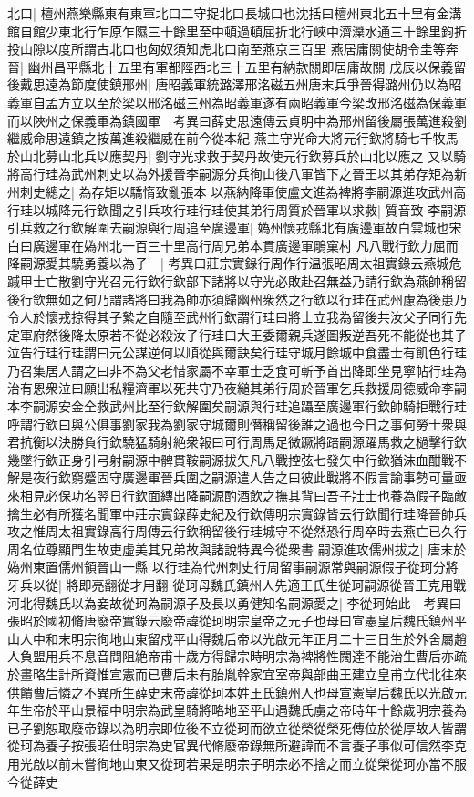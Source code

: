 北口|{
	檀州燕樂縣東有東軍北口二守捉北口長城口也沈括曰檀州東北五十里有金溝館自館少東北行乍原乍隰三十餘里至中頓過頓屈折北行峽中濟灤水通三十餘里鉤折投山隙以度所謂古北口也匈奴須知虎北口南至燕京三百里}
燕居庸關使胡令圭等奔晉|{
	幽州昌平縣北十五里有軍都陘西北三十五里有納款關即居庸故關}
戊辰以保義留後戴思遠為節度使鎮邢州|{
	唐昭義軍統潞澤邢洺磁五州唐末兵爭晉得潞州仍以為昭義軍自孟方立以至於梁以邢洺磁三州為昭義軍遂有兩昭義軍今梁改邢洺磁為保義軍而以陜州之保義軍為鎮國軍　考異曰薛史思遠傳云貞明中為邢州留後屬張萬進殺劉繼威命思遠鎮之按萬進殺繼威在前今從本紀}
燕主守光命大將元行欽將騎七千牧馬於山北募山北兵以應契丹|{
	劉守光求救于契丹故使元行欽募兵於山北以應之}
又以騎將高行珪為武州刺史以為外援晉李嗣源分兵徇山後八軍皆下之晉王以其弟存矩為新州刺史總之|{
	為存矩以驕惰致亂張本}
以燕納降軍使盧文進為裨將李嗣源進攻武州高行珪以城降元行欽聞之引兵攻行珪行珪使其弟行周質於晉軍以求救|{
	質音致}
李嗣源引兵救之行欽解圍去嗣源與行周追至廣邊軍|{
	媯州懷戎縣北有廣邊軍故白雲城也宋白曰廣邊軍在媯州北一百三十里高行周兄弟本貫廣邊軍鵰窠村}
凡八戰行欽力屈而降嗣源愛其驍勇養以為子　|{
	考異曰莊宗實錄行周作行温張昭周太祖實錄云燕城危䠞甲士亡散劉守光召元行欽行欽部下諸將以守光必敗赴召無益乃請行欽為燕帥稱留後行欽無如之何乃謂諸將曰我為帥亦須歸幽州衆然之行欽以行珪在武州慮為後患乃令人於懷戎掠得其子縶之自隨至武州行欽謂行珪曰將士立我為留後共汝父子同行先定軍府然後降太原若不從必殺汝子行珪曰大王委爾親兵遂圖叛逆吾死不能從也其子泣告行珪行珪謂曰元公謀逆何以順從與爾訣矣行珪守城月餘城中食盡士有飢色行珪乃召集居人謂之曰非不為父老惜家屬不幸軍士乏食可斬予首出降即坐見寧帖行珪為治有恩衆泣曰願出私糧濟軍以死共守乃夜縋其弟行周於晉軍乞兵救援周德威命李嗣本李嗣源安金全救武州比至行欽解圍矣嗣源與行珪追躡至廣邊軍行欽帥騎拒戰行珪呼謂行欽曰與公俱事劉家我為劉家守城爾則僭稱留後誰之過也今日之事何勞士衆與君抗衡以決勝負行欽驍猛騎射絶衆報曰可行周馬足微蹶將踣嗣源躍馬救之檛擊行欽幾墜行欽正身引弓射嗣源中髀貫鞍嗣源拔矢凡八戰控弦七發矢中行欽猶沫血酣戰不解是夜行欽窮蹙固守廣邊軍晉兵圍之嗣源遣人告之曰彼此戰將不假言諭事勢可量亟來相見必保功名翌日行欽面縳出降嗣源酌酒飲之撫其背曰吾子壯士也養為假子臨敵擒生必有所獲名聞軍中莊宗實錄薛史紀及行欽傳明宗實錄皆云行欽聞行珪降晉帥兵攻之惟周太祖實錄高行周傳云行欽稱留後行珪城守不從然恐行周卒時去燕亡已久行周名位尊顯門生故吏虛美其兄弟故與諸說特異今從衆書}
嗣源進攻儒州拔之|{
	唐末於媯州東置儒州領晉山一縣}
以行珪為代州刺史行周留事嗣源常與嗣源假子從珂分將牙兵以從|{
	將即亮翻從才用翻}
從珂母魏氏鎮州人先適王氏生從珂嗣源從晉王克用戰河北得魏氏以為妾故從珂為嗣源子及長以勇健知名嗣源愛之|{
	李從珂始此　考異曰張昭於國初脩唐廢帝實錄云廢帝諱從珂明宗皇帝之元子也母曰宣憲皇后魏氏鎮州平山人中和末明宗徇地山東留戍平山得魏后帝以光啟元年正月二十三日生於外舍屬趙人負盟用兵不息音問阻絶帝甫十歲方得歸宗時明宗為裨將性闊達不能治生曹后亦疏於畫略生計所資惟宣憲而已曹后未有胎胤幹家宜室帝與部曲王建立皇甫立代北往來供饋曹后憐之不異所生薛史末帝諱從珂本姓王氏鎮州人也母宣憲皇后魏氏以光啟元年生帝於平山景福中明宗為武皇騎將略地至平山遇魏氏虜之帝時年十餘歲明宗養為已子劉恕取廢帝錄以為明宗即位後不立從珂而欲立從榮從榮死傳位於從厚故人皆謂從珂為養子按張昭仕明宗為史官異代脩廢帝錄無所避諱而不言養子事似可信然李克用光啟以前未嘗徇地山東又從珂若果是明宗子明宗必不捨之而立從榮從珂亦當不服今從薛史}
